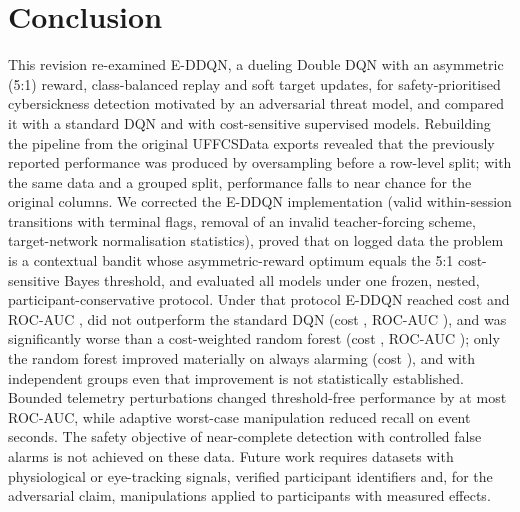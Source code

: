 \section{Conclusion}
\label{sec:conclusion}
This revision re-examined E-DDQN, a dueling Double DQN with an asymmetric (5:1) reward, class-balanced replay and soft target updates, for safety-prioritised cybersickness detection motivated by an adversarial threat model, and compared it with a standard DQN and with cost-sensitive supervised models. Rebuilding the pipeline from the original UFFCSData exports revealed that the previously reported performance was produced by oversampling before a row-level split; with the same data and a grouped split, performance falls to near chance for the original columns. We corrected the E-DDQN implementation (valid within-session transitions with terminal flags, removal of an invalid teacher-forcing scheme, target-network normalisation statistics), proved that on logged data the problem is a contextual bandit whose asymmetric-reward optimum equals the 5:1 cost-sensitive Bayes threshold, and evaluated all models under one frozen, nested, participant-conservative protocol. Under that protocol E-DDQN reached cost \EDDQNCostCostMean{} and ROC-AUC \EDDQNCostRocAucMean, did not outperform the standard DQN (cost \DQNCostCostMean, ROC-AUC \DQNCostRocAucMean), and was significantly worse than a cost-weighted random forest (cost \RFCostCostMean, ROC-AUC \RFCostRocAucMean); only the random forest improved materially on always alarming (cost \AlwaysCost), and with \nGroupsEval{} independent groups even that improvement is not statistically established. Bounded telemetry perturbations changed threshold-free performance by at most \AttAucMaxAbsChange{} ROC-AUC, while adaptive worst-case manipulation reduced recall on event seconds. The safety objective of near-complete detection with controlled false alarms is not achieved on these data. Future work requires datasets with physiological or eye-tracking signals, verified participant identifiers and, for the adversarial claim, manipulations applied to participants with measured effects.

